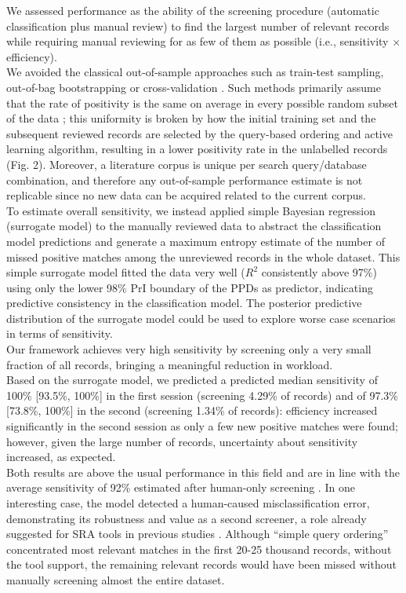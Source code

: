 \documentclass[]{bmcart}
\begin{document}
We assessed performance as the ability of the screening procedure
(automatic classification plus manual review) to find the largest number
of relevant records while requiring manual reviewing for as few of them
as possible (i.e., sensitivity \(\times\) efficiency).\\
We avoided the classical out-of-sample approaches such as train-test
sampling, out-of-bag bootstrapping or cross-validation
\citep{kohavi1995study, james2013introduction}. Such methods primarily
assume that the rate of positivity is the same on average in every
possible random subset of the data \citep{tashman2000out}; this
uniformity is broken by how the initial training set and the subsequent
reviewed records are selected by the query-based ordering and active
learning algorithm, resulting in a lower positivity rate in the
unlabelled records (Fig. 2). Moreover, a literature corpus is unique per
search query/database combination, and therefore any out-of-sample
performance estimate is not replicable since no new data can be acquired
related to the current corpus.\\
To estimate overall sensitivity, we instead applied simple Bayesian
regression (surrogate model) to the manually reviewed data to abstract
the classification model predictions and generate a maximum entropy
\citep{harremoes2001maximum} estimate of the number of missed positive
matches among the unreviewed records in the whole dataset. This simple
surrogate model fitted the data very well (\(R^2\) consistently above
97\%) using only the lower 98\% PrI boundary of the PPDs as predictor,
indicating predictive consistency in the classification model. The
posterior predictive distribution of the surrogate model could be used
to explore worse case scenarios in terms of sensitivity.\\

Our framework achieves very high sensitivity by screening only a very
small fraction of all records, bringing a meaningful reduction in
workload.\\
Based on the surrogate model, we predicted a predicted median
sensitivity of 100\% {[}93.5\%, 100\%{]} in the first session (screening
4.29\% of records) and of 97.3\% {[}73.8\%, 100\%{]} in the second
(screening 1.34\% of records): efficiency increased significantly in the
second session as only a few new positive matches were found; however,
given the large number of records, uncertainty about sensitivity
increased, as expected.\\
Both results are above the usual performance in this field
\citep{o2015using} and are in line with the average sensitivity of 92\%
estimated after human-only screening \citep{edwards2002identification}.
In one interesting case, the model detected a human-caused
misclassification error, demonstrating its robustness and value as a
second screener, a role already suggested for SRA tools in previous
studies
\citep{frunza2010building, bekhuis2012screening, bekhuis2010towards}.
Although ``simple query ordering'' concentrated most relevant matches in
the first 20-25 thousand records, without the tool support, the
remaining relevant records would have been missed without manually
screening almost the entire dataset.\\
\end{document}
